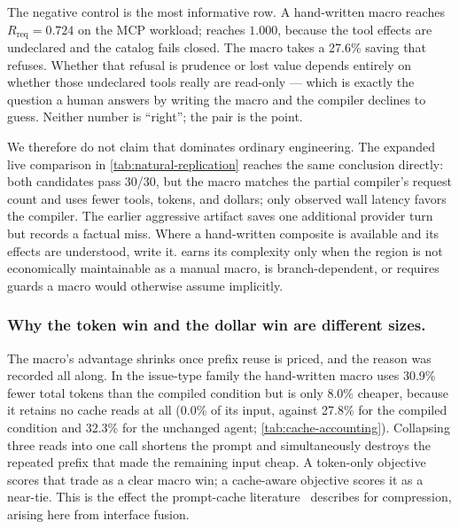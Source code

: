 The negative control is the most informative row.  A hand-written macro reaches
$R_{\mathrm{req}}=0.724$ on the MCP workload; \method{} reaches $1.000$, because the tool
effects are undeclared and the catalog fails closed.  The macro takes a 27.6\% saving that
\method{} refuses.  Whether that refusal is prudence or lost value depends entirely on
whether those undeclared tools really are read-only --- which is exactly the question a
human answers by writing the macro and the compiler declines to guess.  Neither number is
``right''; the pair is the point.

We therefore do not claim that \method{} dominates ordinary engineering.  The expanded
live comparison in \cref{tab:natural-replication} reaches the same conclusion directly:
both candidates pass 30/30, but the macro matches the partial compiler's request count and
uses fewer tools, tokens, and dollars; only observed wall latency favors the compiler.  The
earlier aggressive artifact saves one additional provider turn
but records a factual miss.  Where a
hand-written composite is available and its effects are understood, write it.  \method{}
earns its complexity only when the region is not economically maintainable as a manual
macro, is branch-dependent, or requires guards a macro would otherwise assume implicitly.

\subsubsection{Why the token win and the dollar win are different sizes.}
\label{sec:cache-results}

\begin{table}[t]
  \centering
  \caption{Prompt-cache structure of the primary families, recovered provider-free from
  the retained per-record usage of the same runs.  ``Input'' is mean input tokens per
  episode, ``Cached'' the share of them served as cache reads, ``Cache-write'' the mean
  tokens written per episode.  Cache reads are already priced by each study's frozen
  price table; the shares explain why token and dollar changes diverge.}
  \label{tab:cache-accounting}
  \small
  
\end{table}

The macro's advantage shrinks once prefix reuse is priced, and the reason was recorded all
along.  In the issue-type family the hand-written macro uses 30.9\% fewer total tokens than
the compiled condition but is only 8.0\% cheaper, because it retains no cache reads at all
(0.0\% of its input, against 27.8\% for the compiled condition and 32.3\% for the unchanged
agent; \cref{tab:cache-accounting}).  Collapsing three reads into one call shortens the
prompt and simultaneously destroys the repeated prefix that made the remaining input cheap.
A token-only objective scores that trade as a clear macro win; a cache-aware objective
scores it as a near-tie.  This is the effect the prompt-cache
literature~\cite{lumer2026cache,song2026capc} describes for compression, arising here from
interface fusion.


